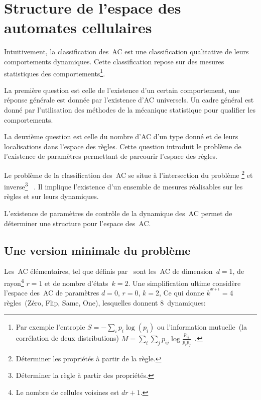 \chapter[Structure de l'espace des AC]%
{Structure de l'espace des automates cellulaires}

Intuitivement, la classification des~AC est une classification
qualitative de leurs comportements dynamiques. %
Cette classification repose sur des mesures statistiques des
comportements\footnote{%
  Par exemple l'entropie %
  $S = - \sum_{i} p_{i} \log(p_{i})$ %
  ou l'information mutuelle~(la corrélation de deux distributions) %
  $M = \sum_{i} \sum_{j} p_{ij} \log \frac{p_{ij}}{p_{i} p_{j}}$~\cite[]{Li90b}.}. %

La première question est celle de l'existence d'un certain
comportement, une réponse générale est donnée par l'existence d'AC
universels. %
Un cadre général est donné par l'utilisation des méthodes de la
mécanique statistique pour qualifier les comportements. %

La deuxième question est celle du nombre d'AC d'un type donné et de
leurs localisations dans l'espace des règles. %
Cette question introduit le problème de l'existence de paramètres
permettant de parcourir l'espace des règles. %

Le problème de la classification des~AC se situe à l'intersection du
problème \footnote{%
  Déterminer les propriétés à partir de la règle.} %
et inverse\footnote{%
  Déterminer la règle à partir des propriétés.}~%
\cite[]{Gutowitz90a}. %
Il implique l'existence d'un ensemble de mesures réalisables sur les
règles et sur leurs dynamiques. %

L'existence de paramètres de contrôle de la dynamique des~AC permet
de déterminer une structure pour l'espace des~AC. %

\section{Une version minimale du problème}

Les~AC élémentaires, tel que définis par~\cite{Wolfram86a}
sont les~AC de dimension~$d = 1$, de rayon\footnote{%
  Le nombre de cellules voisines est $d r + 1$.} %
$r = 1$ et de nombre d'états~$k = 2$. %
Une simplification ultime considère l'espace des~AC de paramètres %
$d = 0$, $r = 0$, $k = 2$, %
Ce qui donne $k^{^{d r + 1}} = 4$ règles~(Zéro, Flip, Same, One),
lesquelles donnent 8~dynamiques:

